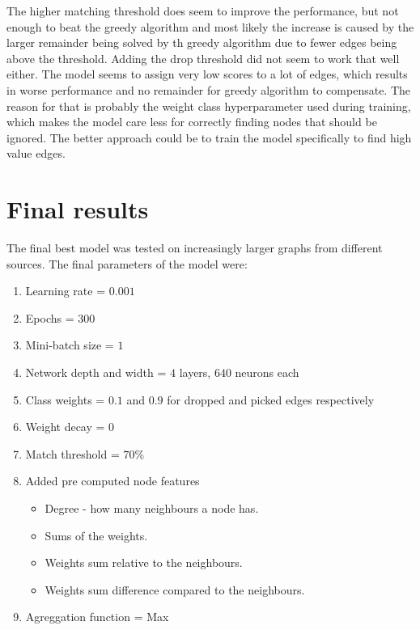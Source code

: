 The higher matching threshold does seem to improve the performance, but not enough to beat the greedy algorithm and most likely the increase is caused by the larger remainder being solved by th greedy algorithm due to fewer edges being above the threshold. Adding the drop threshold did not seem to work that well either. The model seems to assign very low scores to a lot of edges, which results in worse performance and no remainder for greedy algorithm to compensate. The reason for that is probably the weight class hyperparameter used during training, which makes the model care less for correctly finding nodes that should be ignored. The better approach could be to train the model specifically to find high value edges.

\section{Final results}

The final best model was tested on increasingly larger graphs from different sources. The final parameters of the model were:

\begin{enumerate}
\item Learning rate = $0.001$
\item Epochs = $300$
\item Mini-batch size = $1$
\item Network depth and width = $4$ layers, $640$ neurons each
\item Class weights = $0.1$ and $0.9$ for dropped and picked edges respectively
\item Weight decay = $0$
\item Match threshold = $70\%$
\item Added pre computed node features
	\begin{itemize}
	\item Degree - how many neighbours a node has.
	\item Sums of the weights. 	
	\item Weights sum relative to the neighbours.
	\item Weights sum difference compared to the neighbours.
	\end{itemize}
\item Agreggation function = Max
\end{enumerate}

